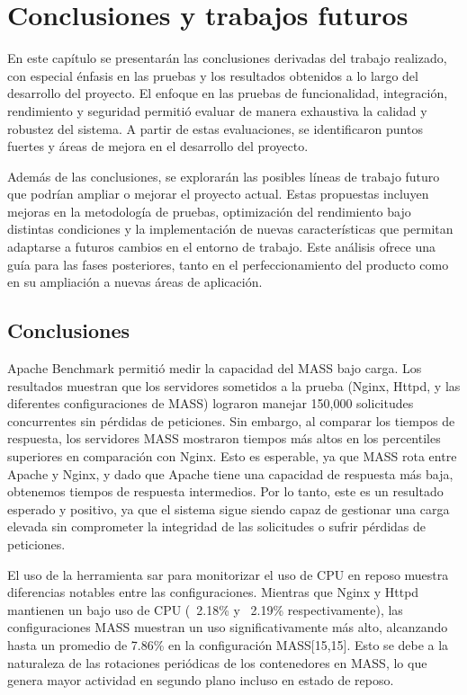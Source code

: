 \chapter{Conclusiones y trabajos futuros}

En este capítulo se presentarán las conclusiones derivadas del trabajo realizado, con especial énfasis en las pruebas y los resultados obtenidos a lo largo del desarrollo del proyecto. El enfoque en las pruebas de funcionalidad, integración, rendimiento y seguridad permitió evaluar de manera exhaustiva la calidad y robustez del sistema. A partir de estas evaluaciones, se identificaron puntos fuertes y áreas de mejora en el desarrollo del proyecto.

Además de las conclusiones, se explorarán las posibles líneas de trabajo futuro que podrían ampliar o mejorar el proyecto actual. Estas propuestas incluyen mejoras en la metodología de pruebas, optimización del rendimiento bajo distintas condiciones y la implementación de nuevas características que permitan adaptarse a futuros cambios en el entorno de trabajo. Este análisis ofrece una guía para las fases posteriores, tanto en el perfeccionamiento del producto como en su ampliación a nuevas áreas de aplicación.

\section{Conclusiones}
Apache Benchmark permitió medir la capacidad del MASS bajo carga. Los resultados muestran que los servidores sometidos a la prueba (Nginx, Httpd, y las diferentes configuraciones de MASS) lograron manejar 150,000 solicitudes concurrentes sin pérdidas de peticiones. Sin embargo, al comparar los tiempos de respuesta, los servidores MASS mostraron tiempos más altos en los percentiles superiores en comparación con Nginx. Esto es esperable, ya que MASS rota entre Apache y Nginx, y dado que Apache tiene una capacidad de respuesta más baja, obtenemos tiempos de respuesta intermedios. Por lo tanto, este es un resultado esperado y positivo, ya que el sistema sigue siendo capaz de gestionar una carga elevada sin comprometer la integridad de las solicitudes o sufrir pérdidas de peticiones.

El uso de la herramienta sar para monitorizar el uso de CPU en reposo muestra diferencias notables entre las configuraciones. Mientras que Nginx y Httpd mantienen un bajo uso de CPU (~2.18\% y ~2.19\% respectivamente), las configuraciones MASS muestran un uso significativamente más alto, alcanzando hasta un promedio de 7.86\% en la configuración MASS[15,15]. Esto se debe a la naturaleza de las rotaciones periódicas de los contenedores en MASS, lo que genera mayor actividad en segundo plano incluso en estado de reposo. 

